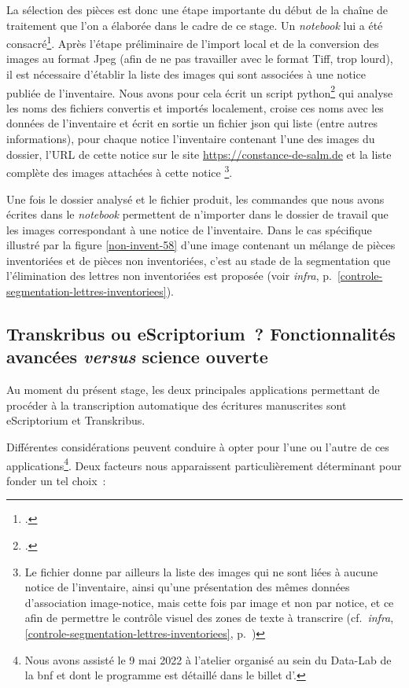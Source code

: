 \documentclass[a4paper,12pt,twoside]{book}
\begin{document}
				La sélection des pièces est donc une étape importante du début de la chaîne de traitement que l'on a élaborée dans le cadre de ce stage. Un \textit{notebook} lui a été consacré\footcite{biayPreparerTraitementDossier2022}. Après l'étape préliminaire de l'import local et de la conversion des images au format Jpeg (afin de ne pas travailler avec le format Tiff, trop lourd), il est nécessaire d'établir la liste des images qui sont associées à une notice publiée de l'inventaire. Nous avons pour cela écrit un script python\footcite{biayDonneesImagesPy2022} qui analyse les noms des fichiers convertis et importés localement, croise ces noms avec les données de l'inventaire et écrit en sortie un fichier \gls{json} qui liste (entre autres informations), pour chaque notice l'inventaire contenant l'une des images du dossier, l'URL de cette notice sur le site \url{https://constance-de-salm.de} et la liste complète des images attachées à cette notice
				\label{donnees-images}
				\footnote{Le fichier donne par ailleurs la liste des images qui ne sont liées à aucune notice de l'inventaire, ainsi qu'une présentation des mêmes données d'association image-notice, mais cette fois par image et non par notice, et ce afin de permettre le contrôle visuel des zones de texte à transcrire (cf.~\textit{infra}, \ref{controle-segmentation-lettres-inventoriees}, p.~\pageref{controle-segmentation-lettres-inventoriees})}.
				
				Une fois le dossier analysé et le fichier produit, les commandes que nous avons écrites dans le \textit{notebook} permettent de n'importer dans le dossier de travail que les images correspondant à une notice de l'inventaire. Dans le cas spécifique illustré par la figure \ref{non-invent-58} d'une image contenant un mélange de pièces inventoriées et de pièces non inventoriées, c'est au stade de la segmentation que l'élimination des lettres non inventoriées est proposée (voir \textit{infra}, p.~\ref{controle-segmentation-lettres-inventoriees}).
							
			\subsection[Transkribus ou eScriptorium~?]{Transkribus ou eScriptorium~? Fonctionnalités avancées \textit{versus} science ouverte}
				Au moment du présent stage, les deux principales applications permettant de procéder à la transcription automatique des écritures manuscrites sont eScriptorium et Transkribus.
				
				Différentes considérations peuvent conduire à opter pour l'une ou l'autre de ces applications\footnote{Nous avons assisté le 9 mai 2022 à l'atelier organisé au sein du Data-Lab de la \gls{bnf} et dont le programme est détaillé dans le billet d'\cite{jacquotTranskribusEScriptoriumTranscrire}.}. Deux facteurs nous apparaissent particulièrement déterminant pour fonder un tel choix~:
				
\end{document}
